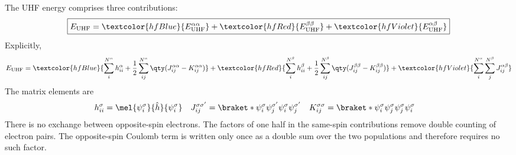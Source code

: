 \documentclass[11pt,a4paper,titlepage]{article}
\numberwithin{equation}{section}
\newcommand{\hh}{\Hat{h}}
\newcommand{\red}[1]{\textcolor{hfRed}{#1}}
\newcommand{\blue}[1]{\textcolor{hfBlue}{#1}}
\newcommand{\violet}[1]{\textcolor{hfViolet}{#1}}
\begin{document}
The UHF energy comprises three contributions:
\begin{equation}
  \boxed{
  E_\text{UHF}
  =\blue{E_\text{UHF}^{\alpha\alpha}}
  +\red{E_\text{UHF}^{\beta\beta}}
  +\violet{E_\text{UHF}^{\alpha\beta}}
  }
\end{equation}
Explicitly,
\begin{equation}
  E_\text{UHF}
  =\blue{\sum_i^{N^\alpha}h_{ii}^\alpha
    +\frac{1}{2}\sum_{ij}^{N^\alpha}
      \qty(J_{ij}^{\alpha\alpha}-K_{ij}^{\alpha\alpha})}
  \\
  +\red{\sum_i^{N^\beta}h_{ii}^\beta
    +\frac{1}{2}\sum_{ij}^{N^\beta}
      \qty(J_{ij}^{\beta\beta}-K_{ij}^{\beta\beta})}
  \\
  +\violet{\sum_i^{N^\alpha}\sum_j^{N^\beta}
    J_{ij}^{\alpha\beta}}
\end{equation}
The matrix elements are
\begin{align}
  h_{ii}^\sigma
  &=\mel{\psi_i^\sigma}{\hh}{\psi_i^\sigma}
  &
  J_{ij}^{\sigma\sigma'}
  &=\braket*{\psi_i^\sigma\psi_j^{\sigma'}}
    {\psi_i^\sigma\psi_j^{\sigma'}}
  &
  K_{ij}^{\sigma\sigma}
  &=\braket*{\psi_i^\sigma\psi_j^\sigma}
    {\psi_j^\sigma\psi_i^\sigma}
\end{align}
There is no exchange between opposite-spin electrons.
The factors of one half in the same-spin contributions remove double counting
of electron pairs. The opposite-spin Coulomb term is written only once as a
double sum over the two populations and therefore requires no such factor.
\end{document}
